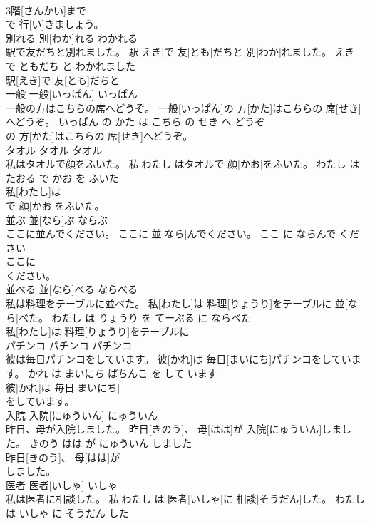 \documentclass[8pt]{extreport}
\begin{document}
\begin{CJK}{UTF8}{min}
\\	3階[さんかい]まで
\\	で 行[い]きましょう。			
\\	別れる	別[わか]れる	わかれる	
\\	駅で友だちと別れました。	駅[えき]で 友[とも]だちと 別[わか]れました。	えき で ともだち と わかれました	
\\	駅[えき]で 友[とも]だちと
\\	一般	一般[いっぱん]	いっぱん	
\\	一般の方はこちらの席へどうぞ。	一般[いっぱん]の 方[かた]はこちらの 席[せき]へどうぞ。	いっぱん の かた は こちら の せき へ どうぞ	
\\	の 方[かた]はこちらの 席[せき]へどうぞ。			
\\	タオル	タオル	タオル	
\\	私はタオルで顔をふいた。	私[わたし]はタオルで 顔[かお]をふいた。	わたし は たおる で かお を ふいた	
\\	私[わたし]は
\\	で 顔[かお]をふいた。			
\\	並ぶ	並[なら]ぶ	ならぶ	
\\	ここに並んでください。	ここに 並[なら]んでください。	ここ に ならんで ください	
\\	ここに
\\	ください。			
\\	並べる	並[なら]べる	ならべる	
\\	私は料理をテーブルに並べた。	私[わたし]は 料理[りょうり]をテーブルに 並[なら]べた。	わたし は りょうり を てーぶる に ならべた	
\\	私[わたし]は 料理[りょうり]をテーブルに
\\	パチンコ	パチンコ	パチンコ	
\\	彼は毎日パチンコをしています。	彼[かれ]は 毎日[まいにち]パチンコをしています。	かれ は まいにち ぱちんこ を して います	
\\	彼[かれ]は 毎日[まいにち]
\\	をしています。			
\\	入院	入院[にゅういん]	にゅういん	
\\	昨日、母が入院しました。	昨日[きのう]、 母[はは]が 入院[にゅういん]しました。	きのう はは が にゅういん しました	
\\	昨日[きのう]、 母[はは]が
\\	しました。			
\\	医者	医者[いしゃ]	いしゃ	
\\	私は医者に相談した。	私[わたし]は 医者[いしゃ]に 相談[そうだん]した。	わたし は いしゃ に そうだん した	

\end{CJK}
\end{document}
